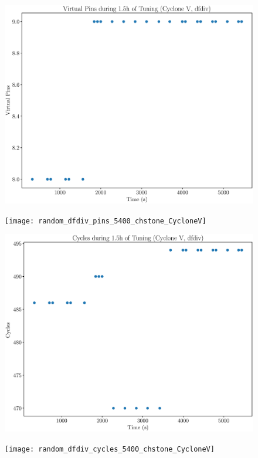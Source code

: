 \documentclass[12pt, a4paper]{article}
\begin{document}
\begin{figure}[htpb]
    \begin{minipage}{.48\textwidth}
        \includegraphics[scale=.25]{dfdiv_pins_5400_chstone_CycloneV}
    \end{minipage}%
    \hfill
    \begin{minipage}{.48\textwidth}
        \texttt{[image: random\_dfdiv\_pins\_5400\_chstone\_CycloneV]}
    \end{minipage}%

    \begin{minipage}{.48\textwidth}
        \includegraphics[scale=.25]{dfdiv_cycles_5400_chstone_CycloneV}
    \end{minipage}%
    \hfill
    \begin{minipage}{.48\textwidth}
        \texttt{[image: random\_dfdiv\_cycles\_5400\_chstone\_CycloneV]}
    \end{minipage}%
\end{figure}
\end{document}
